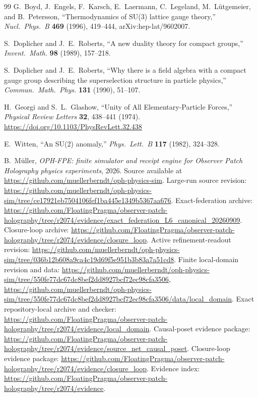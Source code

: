 \documentclass[11pt]{article}
\begin{document}
\begin{thebibliography}{99}
G.~Boyd, J.~Engels, F.~Karsch, E.~Laermann, C.~Legeland, M.~L\"utgemeier, and B.~Petersson,
``Thermodynamics of SU(3) lattice gauge theory,''
\emph{Nucl.\ Phys.\ B} \textbf{469} (1996), 419--444, arXiv:hep-lat/9602007.

S.~Doplicher and J.~E.~Roberts,
``A new duality theory for compact groups,''
\emph{Invent.\ Math.} \textbf{98} (1989), 157--218.

S.~Doplicher and J.~E.~Roberts,
``Why there is a field algebra with a compact gauge group describing the superselection structure in particle physics,''
\emph{Commun.\ Math.\ Phys.} \textbf{131} (1990), 51--107.

H.~Georgi and S.~L.~Glashow,
``Unity of All Elementary-Particle Forces,''
\emph{Physical Review Letters} \textbf{32}, 438--441 (1974).
\url{https://doi.org/10.1103/PhysRevLett.32.438}

E.~Witten,
``An SU(2) anomaly,''
\emph{Phys.\ Lett.\ B} \textbf{117} (1982), 324--328.

B.~M\"uller,
\emph{OPH-FPE: finite simulator and receipt engine for Observer Patch Holography physics experiments},
2026.
Source available at \url{https://github.com/muellerberndt/oph-physics-sim}.
Large-run source revision:
\url{https://github.com/muellerberndt/oph-physics-sim/tree/ce17921eb7504106fef1ba445e1349b5367aa676}.
Exact-federation archive:
\url{https://github.com/FloatingPragma/observer-patch-holography/tree/r2074/evidence/exact_federation_L6_canonical_20260909}.
Closure-loop archive:
\url{https://github.com/FloatingPragma/observer-patch-holography/tree/r2074/evidence/closure_loop}.
Active refinement-readout revision:
\url{https://github.com/muellerberndt/oph-physics-sim/tree/036b12b608a9ca4c19d69f5e951b3b83a7a51cd8}.
Finite local-domain revision and data:
\url{https://github.com/muellerberndt/oph-physics-sim/tree/550fe77dc67dc8bef2dd8927bcf72ec98cfa3506},
\url{https://github.com/muellerberndt/oph-physics-sim/tree/550fe77dc67dc8bef2dd8927bcf72ec98cfa3506/data/local_domain}.
Exact repository-local archive and checker:
\url{https://github.com/FloatingPragma/observer-patch-holography/tree/r2074/evidence/local_domain}.
Causal-poset evidence package:
\url{https://github.com/FloatingPragma/observer-patch-holography/tree/r2074/evidence/source_net_causal_poset}.
Closure-loop evidence package:
\url{https://github.com/FloatingPragma/observer-patch-holography/tree/r2074/evidence/closure_loop}.
Evidence index:
\url{https://github.com/FloatingPragma/observer-patch-holography/tree/r2074/evidence}.


\end{thebibliography}
\end{document}
